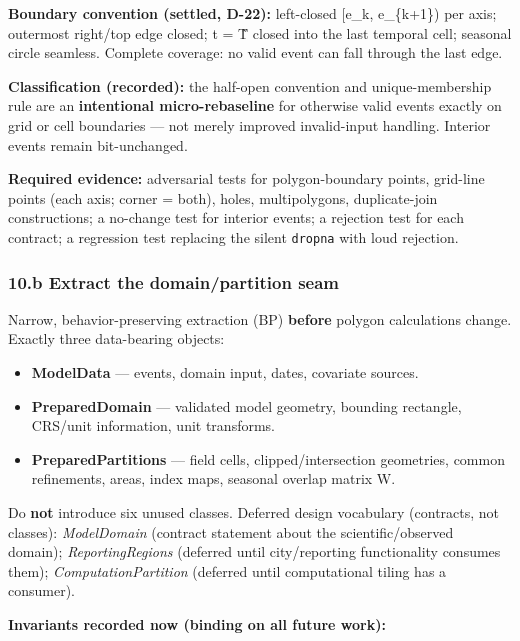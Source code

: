 \documentclass[
  10pt,
]{article}
\providecommand{\tightlist}{%
  \setlength{\itemsep}{0pt}\setlength{\parskip}{0pt}}
\begin{document}
\textbf{Boundary convention (settled, D-22):} left-closed {[}e\_k, e\_\{k+1\}) per axis; outermost right/top edge closed; t = T̃ closed into the last temporal cell; seasonal circle seamless. Complete coverage: no valid event can fall through the last edge.

\textbf{Classification (recorded):} the half-open convention and unique-membership rule are an \textbf{intentional micro-rebaseline} for otherwise valid events exactly on grid or cell boundaries --- not merely improved invalid-input handling. Interior events remain bit-unchanged.

\textbf{Required evidence:} adversarial tests for polygon-boundary points, grid-line points (each axis; corner = both), holes, multipolygons, duplicate-join constructions; a no-change test for interior events; a rejection test for each contract; a regression test replacing the silent \texttt{dropna} with loud rejection.

\hypertarget{b-extract-the-domainpartition-seam}{%
\subsubsection{10.b Extract the domain/partition seam}\label{b-extract-the-domainpartition-seam}}

Narrow, behavior-preserving extraction (BP) \textbf{before} polygon calculations change. Exactly three data-bearing objects:

\begin{itemize}
\tightlist
\item
  \textbf{ModelData} --- events, domain input, dates, covariate sources.
\item
  \textbf{PreparedDomain} --- validated model geometry, bounding rectangle, CRS/unit information, unit transforms.
\item
  \textbf{PreparedPartitions} --- field cells, clipped/intersection geometries, common refinements, areas, index maps, seasonal overlap matrix W.
\end{itemize}

Do \textbf{not} introduce six unused classes. Deferred design vocabulary (contracts, not classes): \emph{ModelDomain} (contract statement about the scientific/observed domain); \emph{ReportingRegions} (deferred until city/reporting functionality consumes them); \emph{ComputationPartition} (deferred until computational tiling has a consumer).

\textbf{Invariants recorded now (binding on all future work):}
\end{document}
